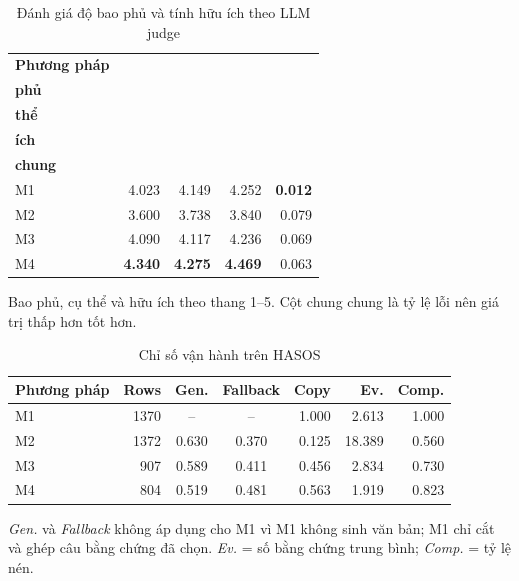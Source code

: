 \documentclass[12pt,a4paper]{report}
\begin{document}
\begin{table}[tbp]
\centering
\caption{Đánh giá độ bao phủ và tính hữu ích theo LLM judge}
\label{tab:summary-quality}
\begin{threeparttable}
\begin{tabular}{l r r r r}
\toprule
\textbf{Phương pháp} & \makecell{\textbf{Bao}\\\textbf{phủ}} & \makecell{\textbf{Cụ}\\\textbf{thể}} & \makecell{\textbf{Hữu}\\\textbf{ích}} & \makecell{\textbf{Chung}\\\textbf{chung}} \\
\midrule
M1 & \num{4.023} & \num{4.149} & \num{4.252} & \textbf{\num{0.012}} \\
M2 & \num{3.600} & \num{3.738} & \num{3.840} & \num{0.079} \\
M3 & \num{4.090} & \num{4.117} & \num{4.236} & \num{0.069} \\
M4 & \textbf{\num{4.340}} & \textbf{\num{4.275}} & \textbf{\num{4.469}} & \num{0.063} \\
\bottomrule
\end{tabular}
\begin{tablenotes}
\footnotesize
\item Bao phủ, cụ thể và hữu ích theo thang 1--5. Cột chung chung là tỷ lệ lỗi nên giá trị thấp hơn tốt hơn.
\end{tablenotes}
\end{threeparttable}
\end{table}

\begin{table}[tbp]
\centering
\caption{Chỉ số vận hành trên HASOS}
\label{tab:production-ops}
\begin{threeparttable}
\begin{tabular}{l r c c r r r}
\toprule
\textbf{Phương pháp} & \textbf{Rows} & \textbf{Gen.} & \textbf{Fallback} & \textbf{Copy} & \textbf{Ev.} & \textbf{Comp.} \\
\midrule
M1 & 1370 & -- & -- & \num{1.000} & \num{2.613} & \num{1.000} \\
M2 & 1372 & \num{0.630} & \num{0.370} & \num{0.125} & \num{18.389} & \num{0.560} \\
M3 &  907 & \num{0.589} & \num{0.411} & \num{0.456} & \num{2.834} & \num{0.730} \\
M4 &  804 & \num{0.519} & \num{0.481} & \num{0.563} & \num{1.919} & \num{0.823} \\
\bottomrule
\end{tabular}
\begin{tablenotes}
\footnotesize
\item \textit{Gen.} và \textit{Fallback} không áp dụng cho M1 vì M1 không sinh văn bản; M1 chỉ cắt và ghép câu bằng chứng đã chọn. \textit{Ev.} = số bằng chứng trung bình; \textit{Comp.} = tỷ lệ nén.
\end{tablenotes}
\end{threeparttable}
\end{table}
\end{document}
